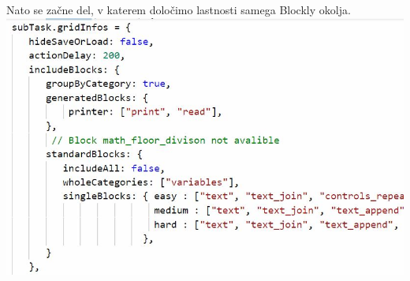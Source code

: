 \documentclass[11pt]{article} %
\begin{document}
Nato se začne del, v katerem določimo lastnosti samega Blockly okolja. \\
\includegraphics[scale=0.6]{task_splosno_grid_infos}\\
\end{document}
